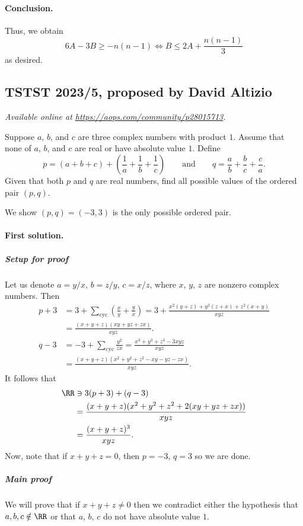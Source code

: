 \documentclass[11pt]{scrartcl}
\begin{document}
\paragraph{Conclusion.}
Thus, we obtain
\[
  6A - 3B \ge -n(n-1)
  \iff B \le 2A + \frac{n(n-1)}3
\]
as desired.
\pagebreak

\subsection{TSTST 2023/5, proposed by David Altizio}
\textsl{Available online at \url{https://aops.com/community/p28015713}.}
\begin{mdframed}[style=mdpurplebox,frametitle={Problem statement}]
Suppose $a$, $b$, and $c$ are three complex numbers with product $1$.
Assume that none of $a$, $b$, and $c$ are real or have absolute value $1$.
Define
\[ p = (a+b+c) + \left( \frac1a+\frac1b+\frac1c \right)
  \qquad\text{and}\qquad
  q = \frac ab + \frac bc + \frac ca. \]
Given that both $p$ and $q$ are real numbers,
find all possible values of the ordered pair $(p,q)$.
\end{mdframed}
We show $(p,q) = (-3,3)$ is the only possible ordered pair.

\paragraph{First solution.}
\subparagraph{Setup for proof}
Let us denote $a = y/x$, $b = z/y$, $c = x/z$,
where $x$, $y$, $z$ are nonzero complex numbers.
Then
\begin{align*}
  p + 3 &= 3 + \sum_{\text{cyc}} \left( \frac xy + \frac yx \right)
  = 3 + \frac{x^2(y+z) + y^2(z+x) + z^2(x+y)}{xyz} \\
  &= \frac{(x+y+z)(xy+yz+zx)}{xyz}. \\
  q - 3 &= -3 + \sum_{\text{cyc}} \frac{y^2}{zx}
  = \frac{x^3+y^3+z^3-3xyz}{xyz} \\
  &= \frac{(x+y+z)(x^2+y^2+z^2-xy-yz-zx)}{xyz}.
\end{align*}
It follows that
\begin{align*}
  \RR &\ni 3(p+3) + (q-3) \\
  &= \frac{(x+y+z)(x^2+y^2+z^2+2(xy+yz+zx))}{xyz} \\
  &= \frac{(x+y+z)^3}{xyz}.
\end{align*}
Now, note that if $x+y+z = 0$, then $p = -3$, $q = 3$ so we are done.

\subparagraph{Main proof}
We will prove that if $x+y+z \neq 0$
then we contradict either the hypothesis that $a,b,c \notin \RR$
or that $a$, $b$, $c$ do not have absolute value $1$.
\end{document}
